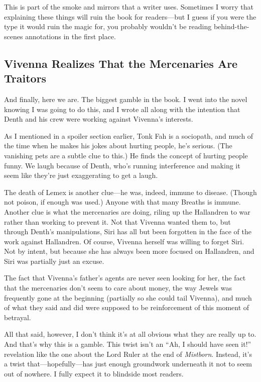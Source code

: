 This is part of the smoke and mirrors that a writer uses. Sometimes I worry that explaining these things will ruin the book for readers—but I guess if you were the type it would ruin the magic for, you probably wouldn’t be reading behind-the-scenes annotations in the first place.

\subsection*{Vivenna Realizes That the Mercenaries Are Traitors}

And finally, here we are. The biggest gamble in the book. I went into the novel knowing I was going to do this, and I wrote all along with the intention that Denth and his crew were working against Vivenna’s interests.

As I mentioned in a spoiler section earlier, Tonk Fah is a sociopath, and much of the time when he makes his jokes about hurting people, he’s serious. (The vanishing pets are a subtle clue to this.) He finds the concept of hurting people funny. We laugh because of Denth, who’s running interference and making it seem like they’re just exaggerating to get a laugh.

The death of Lemex is another clue—he was, indeed, immune to disease. (Though not poison, if enough was used.) Anyone with that many Breaths is immune. Another clue is what the mercenaries are doing, riling up the Hallandren to war rather than working to prevent it. Not that Vivenna wanted them to, but through Denth’s manipulations, Siri has all but been forgotten in the face of the work against Hallandren. Of course, Vivenna herself was willing to forget Siri. Not by intent, but because she has always been more focused on Hallandren, and Siri was partially just an excuse.

The fact that Vivenna’s father’s agents are never seen looking for her, the fact that the mercenaries don’t seem to care about money, the way Jewels was frequently gone at the beginning (partially so she could tail Vivenna), and much of what they said and did were supposed to be reinforcement of this moment of betrayal.

All that said, however, I don’t think it’s at all obvious what they are really up to. And that’s why this is a gamble. This twist isn’t an “Ah, I should have seen it!” revelation like the one about the Lord Ruler at the end of \textit{Mistborn}. Instead, it’s a twist that—hopefully—has just enough groundwork underneath it not to seem out of nowhere. I fully expect it to blindside most readers.

